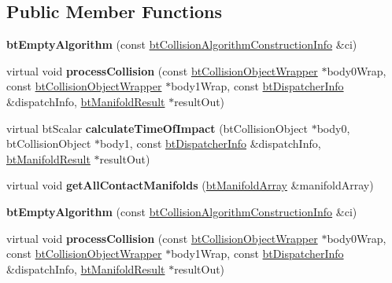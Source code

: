 \subsection*{Public Member Functions}
\begin{DoxyCompactItemize}
\item 
\mbox{\label{classbtEmptyAlgorithm_a4c68f947391c678e2e9b4a5f1e71e41c}} 
{\bfseries bt\+Empty\+Algorithm} (const \hyperlink{structbtCollisionAlgorithmConstructionInfo}{bt\+Collision\+Algorithm\+Construction\+Info} \&ci)
\item 
\mbox{\label{classbtEmptyAlgorithm_ada6f4b8418ca7c73d3523d5b4a87e89a}} 
virtual void {\bfseries process\+Collision} (const \hyperlink{structbtCollisionObjectWrapper}{bt\+Collision\+Object\+Wrapper} $\ast$body0\+Wrap, const \hyperlink{structbtCollisionObjectWrapper}{bt\+Collision\+Object\+Wrapper} $\ast$body1\+Wrap, const \hyperlink{structbtDispatcherInfo}{bt\+Dispatcher\+Info} \&dispatch\+Info, \hyperlink{classbtManifoldResult}{bt\+Manifold\+Result} $\ast$result\+Out)
\item 
\mbox{\label{classbtEmptyAlgorithm_a55f2d297e9aa153c20940bd45aa12218}} 
virtual bt\+Scalar {\bfseries calculate\+Time\+Of\+Impact} (bt\+Collision\+Object $\ast$body0, bt\+Collision\+Object $\ast$body1, const \hyperlink{structbtDispatcherInfo}{bt\+Dispatcher\+Info} \&dispatch\+Info, \hyperlink{classbtManifoldResult}{bt\+Manifold\+Result} $\ast$result\+Out)
\item 
\mbox{\label{classbtEmptyAlgorithm_aa43e4b766663a04a38d30f43bed2133b}} 
virtual void {\bfseries get\+All\+Contact\+Manifolds} (\hyperlink{classbtAlignedObjectArray}{bt\+Manifold\+Array} \&manifold\+Array)
\item 
\mbox{\label{classbtEmptyAlgorithm_a4c68f947391c678e2e9b4a5f1e71e41c}} 
{\bfseries bt\+Empty\+Algorithm} (const \hyperlink{structbtCollisionAlgorithmConstructionInfo}{bt\+Collision\+Algorithm\+Construction\+Info} \&ci)
\item 
\mbox{\label{classbtEmptyAlgorithm_a0315be47c33ea7bfe1dd9f34716c248b}} 
virtual void {\bfseries process\+Collision} (const \hyperlink{structbtCollisionObjectWrapper}{bt\+Collision\+Object\+Wrapper} $\ast$body0\+Wrap, const \hyperlink{structbtCollisionObjectWrapper}{bt\+Collision\+Object\+Wrapper} $\ast$body1\+Wrap, const \hyperlink{structbtDispatcherInfo}{bt\+Dispatcher\+Info} \&dispatch\+Info, \hyperlink{classbtManifoldResult}{bt\+Manifold\+Result} $\ast$result\+Out)

\end{DoxyCompactItemize}
